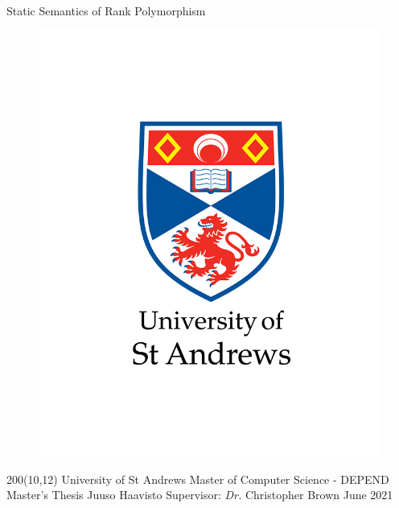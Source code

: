 \documentclass{report}
\begin{document}
\begin{titlepage}
    $ $ %
    \vspace{4cm}
    \begin{center}
        \huge{Static Semantics of Rank Polymorphism}
    \end{center}    
    
    \begin{figure}[ht]
        \centering
        \begin{minipage}[b]{0.35\textwidth}
            \includegraphics[width=\textwidth]{01-standard-vertical-black-text.png}
        \end{minipage}
    \end{figure}
    
    \begin{textblock}{200}(10,12)%
    \obeylines
    \setlength{\parskip}{0cm}
        University of St Andrews
        Master of Computer Science - DEPEND
        Master's Thesis
        Juuso Haavisto
        Supervisor: \textit{Dr.} Christopher Brown
        June 2021
    \end{textblock}%
    
\end{titlepage}
\end{document}
